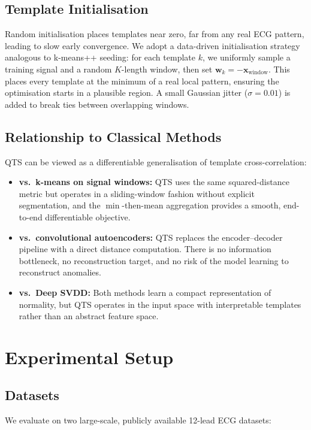 \documentclass{iopjournal}
\begin{document}
\subsection{Template Initialisation}

Random initialisation places templates near zero, far from any real ECG pattern, leading to slow early convergence. We adopt a data-driven initialisation strategy analogous to k-means++ seeding: for each template $k$, we uniformly sample a training signal and a random $K$-length window, then set $\mathbf{w}_k = -\mathbf{x}_\mathrm{window}$. This places every template at the minimum of a real local pattern, ensuring the optimisation starts in a plausible region. A small Gaussian jitter ($\sigma = 0.01$) is added to break ties between overlapping windows.

\subsection{Relationship to Classical Methods}

QTS can be viewed as a differentiable generalisation of template cross-correlation:
\begin{itemize}
\item \textbf{vs.\ k-means on signal windows:} QTS uses the same squared-distance metric but operates in a sliding-window fashion without explicit segmentation, and the $\min$-then-mean aggregation provides a smooth, end-to-end differentiable objective.
\item \textbf{vs.\ convolutional autoencoders:} QTS replaces the encoder--decoder pipeline with a direct distance computation. There is no information bottleneck, no reconstruction target, and no risk of the model learning to reconstruct anomalies.
\item \textbf{vs.\ Deep SVDD:} Both methods learn a compact representation of normality, but QTS operates in the input space with interpretable templates rather than an abstract feature space.
\end{itemize}

\section{Experimental Setup}

\subsection{Datasets}

We evaluate on two large-scale, publicly available 12-lead ECG datasets:
\end{document}
